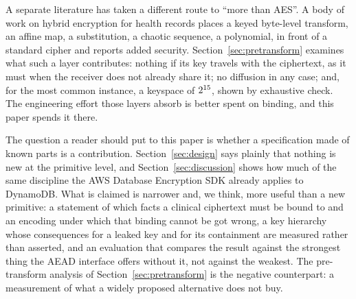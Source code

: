A separate literature has taken a different route to ``more than AES''. A body of work on hybrid encryption for health records places a keyed byte-level transform, an affine map, a substitution, a chaotic sequence, a polynomial, in front of a standard cipher and reports added security. Section~\ref{sec:pretransform} examines what such a layer contributes: nothing if its key travels with the ciphertext, as it must when the receiver does not already share it; no diffusion in any case; and, for the most common instance, a keyspace of $2^{15}$, shown by exhaustive check. The engineering effort those layers absorb is better spent on binding, and this paper spends it there.

The question a reader should put to this paper is whether a specification made of known parts is a contribution. Section~\ref{sec:design} says plainly that nothing is new at the primitive level, and Section~\ref{sec:discussion} shows how much of the same discipline the AWS Database Encryption SDK already applies to DynamoDB. What is claimed is narrower and, we think, more useful than a new primitive: a statement of which facts a clinical ciphertext must be bound to and an encoding under which that binding cannot be got wrong, a key hierarchy whose consequences for a leaked key and for its containment are measured rather than asserted, and an evaluation that compares the result against the strongest thing the AEAD interface offers without it, not against the weakest. The pre-transform analysis of Section~\ref{sec:pretransform} is the negative counterpart: a measurement of what a widely proposed alternative does not buy.

